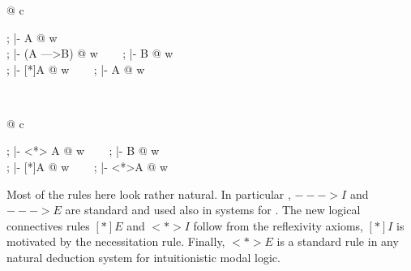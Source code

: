 \subsubsection{\logicL{}}

\begin{center}
\footnotesize
\begin{spacing}{2.5}
\begin{tabular}{@{} c }

			    {\Omega; \Gamma |-  A @ w}\\

			    {\Omega; \Gamma |- (A --->B) @ w} ~~~
			     {\Omega; \Gamma |- B @ w}\\

			     {\Omega; \Gamma |- [*]A @ w} ~~~
				 {\Omega; \Gamma |- A @ w}\\

\end{tabular}\\

\begin{tabular}{@{} c }

			     {\Omega; \Gamma |- <*> A @ w} ~~~
\inference[($\Diamond E$)~]
	{\Omega; \Gamma |- <*>A @ w ~~ \fresh w_0 ~~
	w_0 :: \Omega; (A @ w_0) :: \Gamma |- B @ w}
	{\Omega; \Gamma |- B @ w} \\

			      {\Omega; \Gamma |- [*]A @ w} ~~~
 			    {\Omega; \Gamma |- <*>A @ w}

\end{tabular}
\end{spacing}
\normalsize
\end{center}


Most of the rules here look rather natural. In particular \hype{}, $--->I$ and\\ $--->E$ are standard and used also in \ND{} systems for \IL{}. The new logical connectives rules $[*]E$ and $<*>I$ follow from the reflexivity axioms, $[*]I$ is motivated by the necessitation rule. Finally, $<*>E$ is a standard rule in any natural deduction system for intuitionistic modal logic.\\

